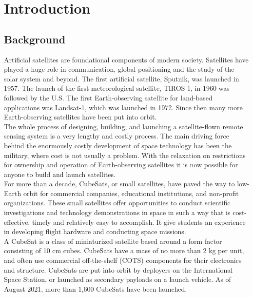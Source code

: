 \chapter{Introduction}

\justifying
\section{Background}

     Artificial satellites are foundational components of modern society. Satellites have played a huge role in communication, global positioning and the study of the solar system and beyond. The first artificial satellite, Sputnik, was launched in 1957. The launch of the first
meteorological satellite, TIROS-1, in 1960 was followed by the U.S. The first Earth-observing satellite for land-based applications was Landsat-1, which was launched in 1972. Since then many more Earth-observing satellites have been put into orbit. 
\\

The whole process of designing, building, and launching a satellite-flown remote sensing system is a very lengthy and costly process. The main driving force behind the enormously costly development
of space technology has been the military, where cost is not usually a problem. With the relaxation on restrictions for ownership and operation of Earth-observing satellites it is now possible for anyone to build and launch satellites.
\\

For more than a decade, CubeSats, or small satellites, have paved the way to
low-Earth orbit for commercial companies, educational institutions, and non-profit
organizations. These small satellites offer opportunities to conduct scientific
investigations and technology demonstrations in space in such a way that is
cost-effective, timely and relatively easy to accomplish.
It give students an
experience in developing flight hardware and conducting space missions.\\


A CubeSat is a class of miniaturized satellite based around a form factor consisting
of 10 cm cubes. CubeSats have a mass of no more than 2 kg per unit, and often use
commercial off-the-shelf (COTS) components for their electronics and structure.
CubeSats are put into orbit by deployers on the International Space Station, or
launched as secondary payloads on a launch vehicle. As of August 2021, more than
1,600 CubeSats have been launched.
\\

